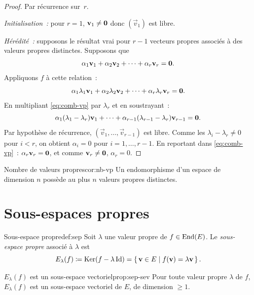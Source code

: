 \begin{proof}
  Par récurrence sur~$r$.

  \emph{Initialisation~:} pour $r=1$, $\mathbf{v}_1\neq\mathbf{0}$ donc
  $(\vec{v}_1)$ est libre.

  \emph{Hérédité~:} supposons le résultat vrai pour $r-1$ vecteurs propres
  associés à des valeurs propres distinctes. Supposons que
  \begin{equation}\label{eq:comb-vp}
    \alpha_1\mathbf{v}_1+\alpha_2\mathbf{v}_2+\cdots+\alpha_r\mathbf{v}_r=\mathbf{0}.
  \end{equation}
  Appliquons $f$ à cette relation~:
  \[
    \alpha_1\lambda_1\mathbf{v}_1+\alpha_2\lambda_2\mathbf{v}_2+\cdots
    +\alpha_r\lambda_r\mathbf{v}_r=\mathbf{0}.
  \]
  En multipliant \eqref{eq:comb-vp} par $\lambda_r$ et en soustrayant~:
  \[
    \alpha_1(\lambda_1-\lambda_r)\mathbf{v}_1+\cdots
    +\alpha_{r-1}(\lambda_{r-1}-\lambda_r)\mathbf{v}_{r-1}=\mathbf{0}.
  \]
  Par hypothèse de récurrence, $(\vec{v}_1,\ldots,\vec{v}_{r-1})$ est
  libre. Comme les $\lambda_i-\lambda_r\neq 0$ pour $i<r$, on obtient
  $\alpha_i=0$ pour $i=1,\ldots,r-1$. En reportant dans
  \eqref{eq:comb-vp}~: $\alpha_r\mathbf{v}_r=\mathbf{0}$, et comme
  $\mathbf{v}_r\neq\mathbf{0}$, $\alpha_r=0$.
\end{proof}

\begin{corollary}{Nombre de valeurs propres}{cor:nb-vp}
  Un endomorphisme d'un espace de dimension $n$ possède au plus $n$
  valeurs propres distinctes.
\end{corollary}

\section{Sous-espaces propres}\label{sec:sous-espaces-propres}

\begin{definition}{Sous-espace propre}{def:sep}
  Soit $\lambda$ une valeur propre de $f\in\operatorname{End}(E)$.
  Le \emph{sous-espace propre} associé à
  $\lambda$ est
  \[
    E_\lambda(f)\coloneqq\operatorname{Ker}(f-\lambda\operatorname{Id})
    =\left\{\,\mathbf{v}\in E\;\middle|\;f(\mathbf{v})=\lambda\mathbf{v}\,\right\}.
  \]
\end{definition}

\begin{proposition}{$E_\lambda(f)$ est un sous-espace vectoriel}{prop:sep-sev}
  Pour toute valeur propre $\lambda$ de $f$, $E_\lambda(f)$ est un
  sous-espace vectoriel de $E$, de dimension $\geq 1$.
\end{proposition}

